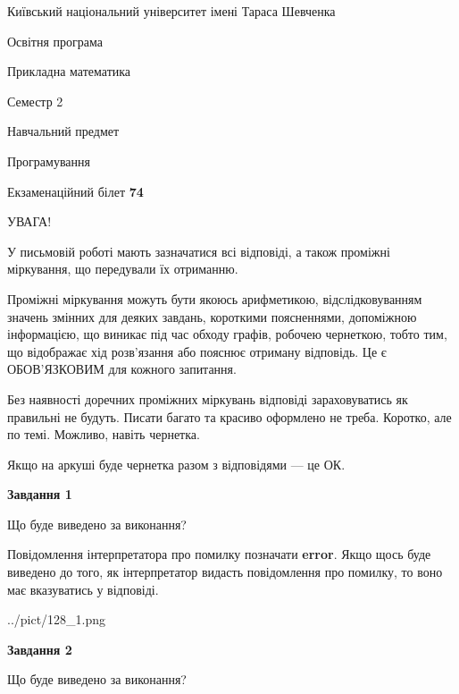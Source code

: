 \documentclass[12pt, ukrainian]{article}
\begin{document}
{{\begin {small}\par
{ \center  Київський національний університет імені Тараса Шевченка \par}
{\parbox {5 cm}{Освітня програма \hfill}{\parbox {7 cm}{Прикладна математика \hfill}}\parbox {6 cm}{\hfill Семестр 2}}\par
{\parbox {5 cm} {Навчальний предмет \hfill}\parbox {7 cm}{Програмування \hfill}\parbox {6cm}{\hfill}\par}\vspace{-7pt} \end{small}}{\center Екзаменаційний білет \No \textbf
{ 74 }\par}}
{
\begin {large}
УВАГА!

У письмовій роботі мають зазначатися всі відповіді, а також проміжні міркування, що передували їх отриманню.

Проміжні міркування можуть бути якоюсь арифметикою, відслідковуванням зна\-чень змінних для деяких завдань,
короткими поясненнями, допоміжною інформацією, що виникає під час обходу графів, робочею чернеткою,
тобто тим, що відображає хід розв’язання або пояснює отриману відповідь.
Це є ОБОВ’ЯЗКОВИМ для кожного запитання.

Без наявності доречних проміжних міркувань відповіді зараховуватись як правиль\-ні не будуть.
Писати багато та красиво оформлено не треба. Коротко, але по темі. Можли\-во, навіть чернетка.

Якщо на аркуші буде чернетка разом з відповідями --- це ОК.

\newpage

{\begin {center}\textbf{Завдання 1}\end {center}}\par
Що буде виведено за виконання?

Повідомлення інтерпретатора про помилку позначати \textbf{error}.
Якщо щось буде виведено до того, як інтерпретатор видасть повідомлення про помилку, 
то воно має вказуватись у відповіді. \par


\begin{center}
	{../pict/128_1.png}
\end{center}
\newpage

{\begin {center}\textbf{Завдання 2}\end {center}}\par
Що буде виведено за виконання?


\end{large}}
\end{document}
